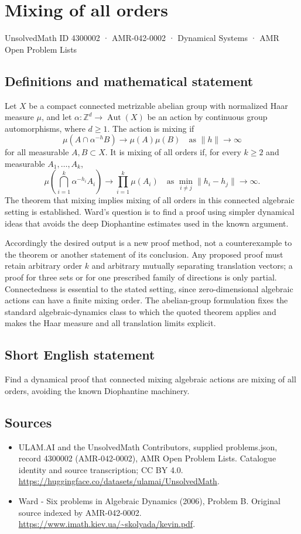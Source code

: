 \documentclass[11pt,a4paper]{article}
\begin{document}
\section*{Mixing of all orders}\label{4300002}
{\small UnsolvedMath ID 4300002 · AMR-042-0002 · Dynamical Systems · AMR Open Problem Lists}
\subsection{Definitions and mathematical statement}
Let $X$ be a compact connected metrizable abelian group with normalized
Haar measure $\mu$, and let $\alpha:\mathbb Z^d\to\operatorname{Aut}(X)$
be an action by continuous group automorphisms, where $d\ge1$.
The action is mixing if
\[
 \mu(A\cap\alpha^{-h}B)\longrightarrow\mu(A)\mu(B)
             \quad\text{as }\|h\|\to\infty
\]
for all measurable $A,B\subset X$. It is mixing of all orders if, for
every $k\ge2$ and measurable $A_1,\ldots,A_k$,
\[
 \mu\!\left(\bigcap_{i=1}^k\alpha^{-h_i}A_i\right)
       \longrightarrow\prod_{i=1}^k\mu(A_i)
 \quad\text{as }\min_{i\ne j}\|h_i-h_j\|\to\infty.
\]
The theorem that mixing implies mixing of all orders in this connected
algebraic setting is established. Ward's question is to find a proof
using simpler dynamical ideas that avoids the deep Diophantine estimates
used in the known argument.

Accordingly the desired output is a new proof method, not a counterexample
to the theorem or another statement of its conclusion. Any proposed proof
must retain arbitrary order $k$ and arbitrary mutually separating
translation vectors; a proof for three sets or for one prescribed family
of directions is only partial. Connectedness is essential to the stated
setting, since zero-dimensional algebraic actions can have a finite mixing
order. The abelian-group formulation fixes the standard algebraic-dynamics
class to which the quoted theorem applies and makes the Haar measure and
all translation limits explicit.
\subsection{Short English statement}
Find a dynamical proof that connected mixing algebraic actions are mixing of all orders, avoiding the known Diophantine machinery.
\subsection{Sources}
\begin{itemize}
\item[S1] ULAM.AI and the UnsolvedMath Contributors, supplied problems.json, record 4300002 (AMR-042-0002), AMR Open Problem Lists. Catalogue identity and source transcription; CC BY 4.0.
\url{https://huggingface.co/datasets/ulamai/UnsolvedMath}.
\item[S2] Ward - Six problems in Algebraic Dynamics (2006), Problem B. Original source indexed by AMR-042-0002.
\url{https://www.imath.kiev.ua/~skolyada/kevin.pdf}.
\end{itemize}
\end{document}
